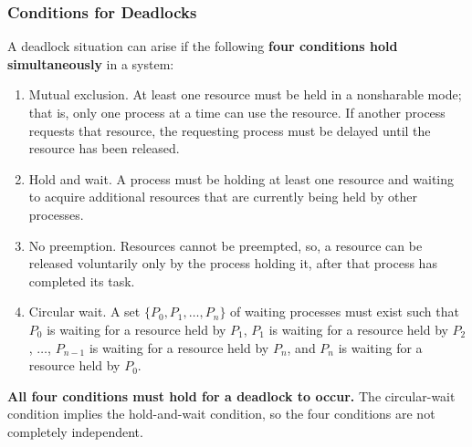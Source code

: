 \subsubsection{Conditions for Deadlocks}\label{subsubsec:Deadlock_Conditions}
A deadlock situation can arise if the following \textbf{four conditions hold simultaneously} in a system:
\begin{enumerate}[noitemsep]
\item Mutual exclusion.
  At least one resource must be held in a nonsharable mode; that is, only one process at a time can use the resource.
  If another process requests that resource, the requesting process must be delayed until the resource has been released.
\item Hold and wait.
  A process must be holding at least one resource and waiting to acquire additional resources that are currently being held by other processes.
\item No preemption.
  Resources cannot be preempted, so, a resource can be released voluntarily only by the process holding it, after that process has completed its task.
\item Circular wait.
  A set $\lbrace P_{0}, P_{1}, \ldots, P_{n} \rbrace$ of waiting processes must exist such that $P_{0}$ is waiting for a resource held by $P_{1}$, $P_{1}$ is waiting for a resource held by $P_{2}$, $\ldots$, $P_{n-1}$ is waiting for a resource held by $P_{n}$, and $P_{n}$ is waiting for a resource held by $P_{0}$.
\end{enumerate}

\textbf{All four conditions must hold for a deadlock to occur.}
The circular-wait condition implies the hold-and-wait condition, so the four conditions are not completely independent.

